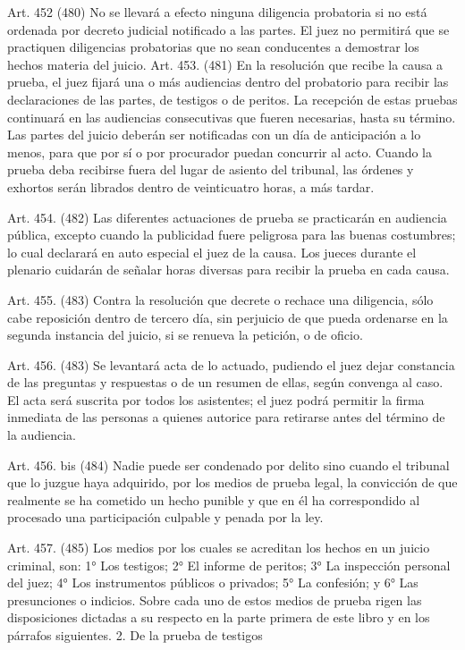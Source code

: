     Art. 452 (480) No se llevará a efecto ninguna diligencia probatoria si no está ordenada por decreto judicial notificado a las partes.
    El juez no permitirá que se practiquen diligencias probatorias que no sean conducentes a demostrar los hechos materia del juicio.
    Art. 453. (481) En la resolución que recibe la causa a prueba, el juez fijará una o más audiencias dentro del probatorio para recibir las declaraciones de las partes, de testigos o de peritos. La recepción de estas pruebas continuará en las audiencias consecutivas que fueren necesarias, hasta su término.
    Las partes del juicio deberán ser notificadas con un día de anticipación a lo menos, para que por sí o por procurador puedan concurrir al acto.
    Cuando la prueba deba recibirse fuera del lugar de asiento del tribunal, las órdenes y exhortos serán librados dentro de veinticuatro horas, a más tardar.

    Art. 454. (482) Las diferentes actuaciones de prueba se practicarán en audiencia pública, excepto cuando la publicidad fuere peligrosa para las buenas costumbres; lo cual declarará en auto especial el juez de la causa.
    Los jueces durante el plenario cuidarán de señalar horas diversas para recibir la prueba en cada causa.


    Art. 455. (483) Contra la resolución que decrete o rechace una diligencia, sólo cabe reposición dentro de tercero día, sin perjuicio de que pueda ordenarse en la segunda instancia del juicio, si se renueva la petición, o de oficio.

    Art. 456. (483) Se levantará acta de lo actuado, pudiendo el juez dejar constancia de las preguntas y respuestas o de un resumen de ellas, según convenga al caso.
    El acta será suscrita por todos los asistentes; el juez podrá permitir la firma inmediata de las personas a quienes autorice para retirarse antes del término de la audiencia.

    Art. 456. bis (484) Nadie puede ser condenado por delito sino cuando el tribunal que lo juzgue haya adquirido, por los medios de prueba legal, la convicción de que realmente se ha cometido un hecho punible y que en él ha correspondido al procesado una participación culpable y penada por la ley.


    Art. 457. (485) Los medios por los cuales se acreditan los hechos en un juicio criminal, son:
    1° Los testigos;
    2° El informe de peritos;
    3° La inspección personal del juez;
    4° Los instrumentos públicos o privados;
    5° La confesión; y
    6° Las presunciones o indicios.
    Sobre cada uno de estos medios de prueba rigen las disposiciones dictadas a su respecto en la parte primera de este libro y en los párrafos siguientes.
    2. De la prueba de testigos

